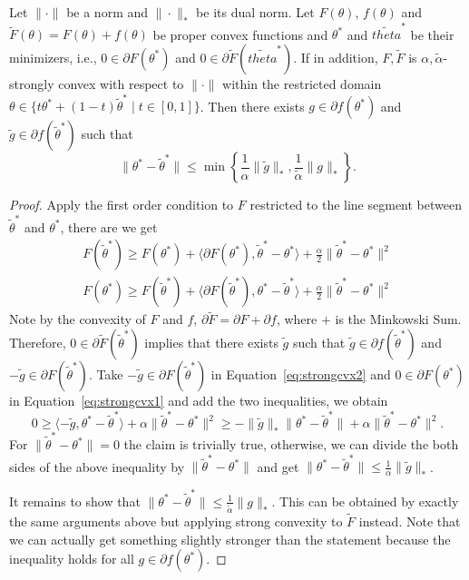 \begin{proposition}\label{prop:generalnorm}
	Let $\|\cdot\|$ be a norm and $\|\cdot\|_*$ be its dual norm. Let $F(\theta)$, $f(\theta)$ and $\tilde{F}(\theta) = F(\theta) + f(\theta)$ be proper convex functions and $\theta^*$ and $\tilde{theta}^*$ be their minimizers, i.e., $0\in \partial F(\theta^*)$ and $0\in \partial \tilde{F}(\tilde{theta}^*)$.  If in addition, $F,\tilde{F}$ is $\alpha,\tilde{\alpha}$-strongly convex with respect to $\|\cdot\|$ within the restricted domain 
	$\theta \in \{  t\theta^* + (1-t)\tilde{\theta}^*  \;|\;  t\in[0,1]  \}$. 	Then there exists $g \in \partial f(\theta^*)$ and $\tilde{g}\in \partial f(\tilde{\theta}^*)$ such that
	$$
	\|\theta^*-\tilde{\theta}^*\| \leq\min\left\{\frac{1}{\alpha}\| \tilde{g}\|_*,  \frac{1}{\tilde{\alpha}}\| g\|_*\right\}.
	$$
\end{proposition}
\begin{proof}
	Apply the first order condition to $F$ restricted to the line segment between $\tilde{\theta}^*$ and $\theta^*$, there are we get
	\begin{align}
	F(\tilde{\theta}^*) \geq F(\theta^*)  +  \langle \partial F(\theta^*),  \tilde{\theta}^*-\theta^* \rangle  + \frac{\alpha}{2}\|\tilde{\theta}^*-\theta^*\|^2\label{eq:strongcvx1} \\
	F(\theta^*) \geq F(\tilde{\theta}^*)  +  \langle \partial F(\tilde{\theta}^*),  \theta^*-\tilde{\theta}^* \rangle  + \frac{\alpha}{2}\|\tilde{\theta}^*-\theta^*\|^2 \label{eq:strongcvx2}
	\end{align}
	Note by the convexity of $F$ and $f$, $\partial\tilde{F}=  \partial F + \partial f$, where $+$ is the Minkowski Sum. Therefore, $0\in \partial\tilde{F}(\tilde{\theta}^*)$ implies that there exists $\tilde{g}$ such that $\tilde{g}\in \partial f(\tilde{\theta}^*)$ and $-\tilde{g}\in\partial F(\tilde{\theta}^*)$.
	Take $-\tilde{g}\in\partial F(\tilde{\theta}^*)$ in Equation~\ref{eq:strongcvx2} and $0 \in \partial F(\theta^*)$ in Equation~\ref{eq:strongcvx1}  and add the two inequalities, we obtain
	$$
		0\geq \langle -\tilde{g},  \theta^*-\tilde{\theta}^* \rangle  + \alpha \|\tilde{\theta}^* - \theta^*\|^2 \geq - \|\tilde{g}\|_* \|\theta^*-\tilde{\theta}^*\|  +  \alpha\|\tilde{\theta}^* - \theta^*\|^2. 
	$$
	For $\|\tilde{\theta}^* - \theta^*\|=0$ the claim is trivially true, otherwise, we can divide the both sides of the above inequality by $\|\tilde{\theta}^* - \theta^*\|$ and get
	$	\|\theta^*-\tilde{\theta}^*\| \leq \frac{1}{\alpha}\| \tilde{g}\|_*$. 
	
	It remains to show that $\|\theta^*-\tilde{\theta}^*\| \leq \frac{1}{\tilde{\alpha}}\|g\|_*$. This can be obtained by exactly the same arguments above but applying strong convexity to $\tilde{F}$ instead. Note that we can actually get something slightly stronger than the statement because the inequality holds for all $g\in \partial f(\theta^*)$.
\end{proof}
